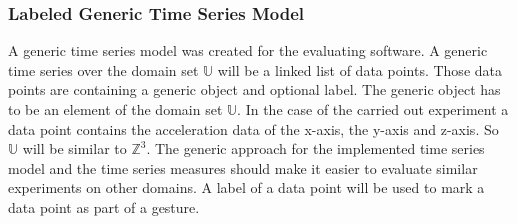 \subsubsection{Labeled Generic Time Series Model} \label{labeled_generic_time_series_model}
A generic time series model was created for the evaluating software. A generic time series over the domain set
$\mathbb{U}$ will be a linked list of data points. Those data points are containing a generic object and optional label.
The generic object has to be an element of the domain set $\mathbb{U}$. In the case of the carried out experiment a
data point contains the acceleration data of the x-axis, the y-axis and z-axis. So $\mathbb{U}$ will be similar to
$\mathbb{Z}^3$. The generic approach for the implemented time series model and the time series measures should make it
easier to evaluate similar experiments on other domains. A label of a data point will be used to mark a data point as
part of a gesture.
